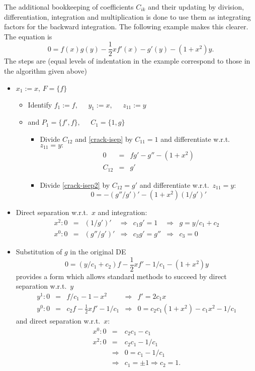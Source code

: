 The additional bookkeeping of coefficients $C_{ik}$ and their updating
by division, differentiation, integration and multiplication is done
to use them as integrating factors for the backward integration.  The
following example makes this clearer.  The equation is
\begin{equation}
0 = f(x) g(y) - \frac{1}{2}xf'(x) - g'(y) - (1+x^2)y. \label{crack-isep}
\end{equation}
The steps are (equal levels of indentation in the example correspond to
those in the algorithm given above)
\begin{itemize}
\item $x_1:=x, \, F=\{f\}$
  \begin{itemize}
  \item Identify $f_1:=f, \; \; \; \; \; y_1:=x, \; \; \; \; \; z_{11}:=y$
  \item and $P_1=\{f',f\}, \; \; \; \; \; C_1=\{1,g\}$
    \begin{itemize}
    \item Divide $C_{12}$ and \eqref{crack-isep} by $C_{11}=1$ and
      differentiate w.r.t.\ $z_{11}=y:$
      \begin{eqnarray}
        0 & = & fg' - g'' - (1+x^2) \label{crack-isep2} \\
        C_{12} & = & g' \nonumber
      \end{eqnarray}
    \item Divide \eqref{crack-isep2} by $C_{12}=g'$ and differentiate
      w.r.t.\ $z_{11}=y$:
      \[ 0 = - (g''/g')' - (1+x^2)(1/g')' \]
    \end{itemize}
  \end{itemize}
\item Direct separation w.r.t.\ $x$ and integration:
  \[ \begin{array}{rclclcl}
    x^2: 0 & = & (1/g')' & \Rightarrow & c_1g' =  1 & \Rightarrow &
    g = y/c_1 + c_2 \\
    x^0: 0 & = & (g''/g')' & \Rightarrow & c_3g' = g'' & \Rightarrow &
    c_3 = 0
  \end{array} \]
\item Substitution of $g$ in the original DE
  \[ 0 = (y/c_1+c_2)f - \frac{1}{2}xf' - 1/c_1 - (1+x^2)y \]
  provides a form which allows  standard methods to
  succeed by direct separation w.r.t.\ $y$
  \[ \begin{array}{rclcl}
    y^1: 0 & = & f/c_1 - 1 - x^2               & \Rightarrow & f'  =  2c_1x \\
    y^0: 0 & = & c_2f - \frac{1}{2}xf' - 1/c_1 & \Rightarrow & 0   =
    c_2c_1(1+x^2) - c_1x^2 - 1/c_1
  \end{array} \]
  and direct separation w.r.t.\ $x$:
  \begin{eqnarray*}
    x^0:  0 & = & c_2c_1 - c_1 \\
    x^2:  0 & = & c_2c_1 - 1/c_1 \\
    & \Rightarrow &  0 = c_1 - 1/c_1 \\
    & \Rightarrow & c_1 = \pm 1 \Rightarrow c_2 = 1.
  \end{eqnarray*}
\end{itemize}
